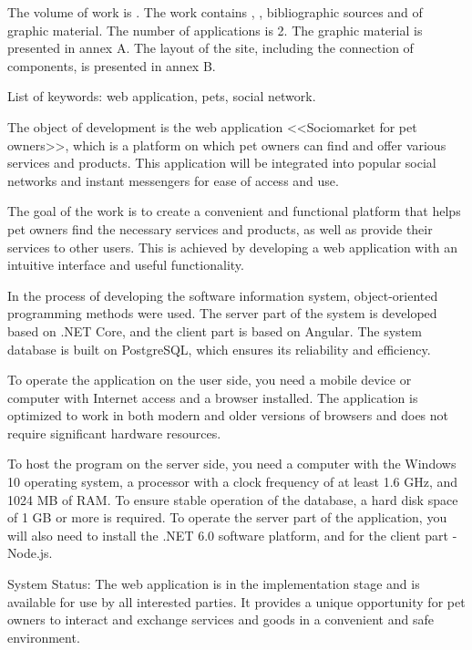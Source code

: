   
The volume of work is . The work contains , ,  bibliographic sources and  of graphic material. The number of applications is 2. The graphic material is presented in annex A. The layout of the site, including the connection of components, is presented in annex B.

List of keywords: web application, pets, social network.

The object of development is the web application <<Sociomarket for pet owners>>, which is a platform on which pet owners can find and offer various services and products. This application will be integrated into popular social networks and instant messengers for ease of access and use.

The goal of the work is to create a convenient and functional platform that helps pet owners find the necessary services and products, as well as provide their services to other users. This is achieved by developing a web application with an intuitive interface and useful functionality.

In the process of developing the software information system, object-oriented programming methods were used. The server part of the system is developed based on .NET Core, and the client part is based on Angular. The system database is built on PostgreSQL, which ensures its reliability and efficiency.

To operate the application on the user side, you need a mobile device or computer with Internet access and a browser installed. The application is optimized to work in both modern and older versions of browsers and does not require significant hardware resources.

To host the program on the server side, you need a computer with the Windows 10 operating system, a processor with a clock frequency of at least 1.6 GHz, and 1024 MB of RAM. To ensure stable operation of the database, a hard disk space of 1 GB or more is required. To operate the server part of the application, you will also need to install the .NET 6.0 software platform, and for the client part -\- Node.js.

System Status: The web application is in the implementation stage and is available for use by all interested parties. It provides a unique opportunity for pet owners to interact and exchange services and goods in a convenient and safe environment.

